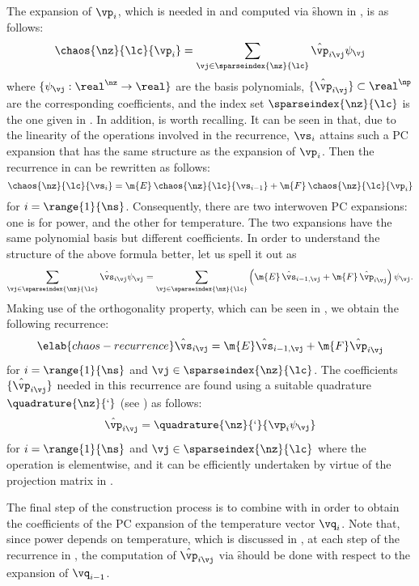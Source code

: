 The expansion of $\vp_i$, which is needed in 
and computed via \f shown in , is as follows:
\[
  \chaos{\nz}{\lc}{\vp_i} = \sum_{\vj \in \sparseindex{\nz}{\lc}} \hat{\vp}_{i \vj} \psi_{\vj}
\]
where $\{ \psi_{\vj}: \real^\nz \to \real \}$ are the basis polynomials, $\{
\hat{\vp}_{i \vj} \} \subset \real^\np$ are the corresponding coefficients, and
the index set $\sparseindex{\nz}{\lc}$ is the one given in
. In addition,
 is worth recalling. It can be seen in
 that, due to the linearity of the operations
involved in the recurrence, $\vs_i$ attains such a \ac{PC} expansion that has
the same structure as the expansion of $\vp_i$. Then the recurrence in
 can be rewritten as follows:
\[
  \chaos{\nz}{\lc}{\vs_i} = \m{E} \, \chaos{\nz}{\lc}{\vs_{i - 1}} + \m{F} \, \chaos{\nz}{\lc}{\vp_i}
\]
for $i = \range{1}{\ns}$. Consequently, there are two interwoven \ac{PC}
expansions: one is for power, and the other for temperature. The two expansions
have the same polynomial basis but different coefficients. In order to
understand the structure of the above formula better, let us spell it out as
\[
  \sum_{\vj \in \sparseindex{\nz}{\lc}} \hat{\vs}_{i \vj} \psi_{\vj} =
  \sum_{\vj \in \sparseindex{\nz}{\lc}} \left(\m{E} \, \hat{\vs}_{i - 1, \vj} + \m{F} \, \hat{\vp}_{i \vj}\right) \psi_{\vj}.
\]
Making use of the orthogonality property, which can be seen in
, we obtain the following recurrence:
\begin{equation} \elab{chaos-recurrence}
  \hat{\vs}_{i \vj} = \m{E} \hat{\vs}_{i - 1, \vj} + \m{F} \hat{\vp}_{i \vj}
\end{equation}
for $i = \range{1}{\ns}$ and $\vj \in \sparseindex{\nz}{\lc}$. The coefficients
$\{ \hat{\vp}_{i \vj} \}$ needed in this recurrence are found using a suitable
quadrature $\quadrature{\nz}{\lq}$ (see ) as follows:
\[
  \hat{\vp}_{i \vj} = \quadrature{\nz}{\lq}{\vp_i \psi_{\vj}}
\]
for $i = \range{1}{\ns}$ and $\vj \in \sparseindex{\nz}{\lc}$ where the
operation is elementwise, and it can be efficiently undertaken by virtue of the
projection matrix in .

The final step of the construction process is to combine 
with  in order to obtain the coefficients of the
\ac{PC} expansion of the temperature vector $\vq_i$. Note that, since power
depends on temperature, which is discussed in , at each step
of the recurrence in , the computation of $\hat{\vp}_{i
\vj}$ via \f should be done with respect to the expansion of $\vq_{i - 1}$.

